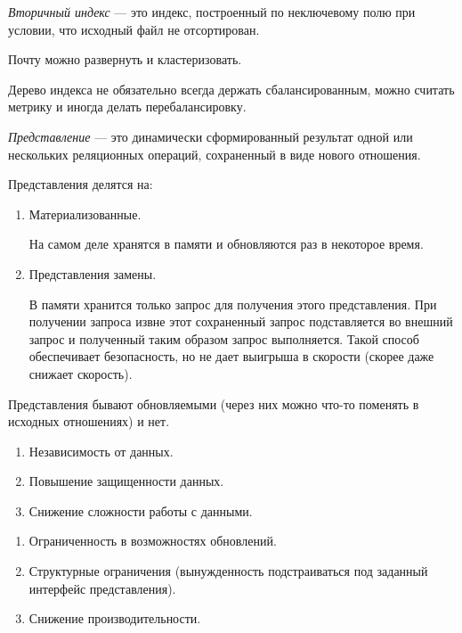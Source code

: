\begin{definition}
  \textit{Вторичный индекс} --- это индекс, построенный по неключевому полю при условии,
  что исходный файл не отсортирован.
\end{definition}

\begin{example}
  Почту можно развернуть и кластеризовать.
\end{example}

\begin{remark}
  Дерево индекса не обязательно всегда держать сбалансированным, можно считать
  метрику  и иногда делать перебалансировку.
\end{remark}


\begin{definition}
  \textit{Представление} --- это динамически сформированный результат одной 
  или нескольких реляционных операций, сохраненный в виде нового отношения.
\end{definition}

Представления делятся на:
\begin{enumerate}
\item
  Материализованные.

  На самом деле хранятся в памяти и обновляются раз в некоторое время.

\item
  Представления замены.

  В памяти хранится только запрос для получения этого представления. При
  получении запроса извне этот сохраненный запрос подставляется во внешний
  запрос и полученный таким образом запрос выполняется. Такой способ
  обеспечивает безопасность, но не дает выигрыша в скорости (скорее даже снижает
  скорость).
\end{enumerate}

Представления бывают обновляемыми (через них можно что-то поменять в исходных
отношениях) и нет.


\begin{enumerate}
\item
  Независимость от данных.

\item
  Повышение защищенности данных.

\item
  Снижение сложности работы с данными.
\end{enumerate}


\begin{enumerate}
\item
  Ограниченность в возможностях обновлений.

\item
  Структурные ограничения (вынужденность подстраиваться под заданный интерфейс
  представления).

\item
  Снижение производительности.
\end{enumerate}
